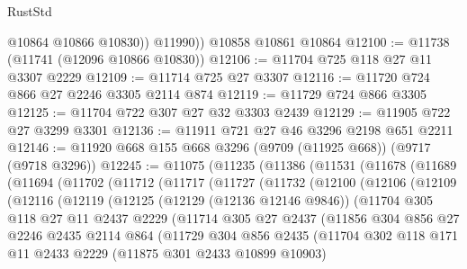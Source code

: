 \begin{lexlean}{RustStd}
\begin{coremodule}
            @10864
            @10866
            @10830))
        @11990))
    @10858
    @10861
    @10864
@12100 := @11738 (@11741 (@12096 @10866 @10830))
@12106 := @11704 @725 @118 @27 @11 @3307 @2229
@12109 := @11714 @725 @27 @3307
@12116 := @11720 @724 @866 @27 @2246 @3305 @2114 @874
@12119 := @11729 @724 @866 @3305
@12125 := @11704 @722 @307 @27 @32 @3303 @2439
@12129 := @11905 @722 @27 @3299 @3301
@12136 := @11911 @721 @27 @46 @3296 @2198 @651 @2211
@12146 := @11920 @668 @155 @668 @3296 (@9709 (@11925 @668)) (@9717 (@9718 @3296))
@12245 := @11075
    (@11235
      (@11386
        (@11531
          (@11678
            (@11689
              (@11694
                (@11702
                  (@11712
                    (@11717
                      (@11727
                        (@11732
                          (@12100
                            (@12106
                              (@12109
                                (@12116
                                  (@12119
                                    (@12125
                                      (@12129 (@12136 @12146 @9846))
                                      (@11704
                                        @305
                                        @118
                                        @27
                                        @11
                                        @2437
                                        @2229
                                        (@11714
                                          @305
                                          @27
                                          @2437
                                          (@11856
                                            @304
                                            @856
                                            @27
                                            @2246
                                            @2435
                                            @2114
                                            @864
                                            (@11729
                                              @304
                                              @856
                                              @2435
                                              (@11704
                                                @302
                                                @118
                                                @171
                                                @11
                                                @2433
                                                @2229
                                                (@11875 @301 @2433 @10899 @10903)

\end{coremodule}
\end{lexlean}
